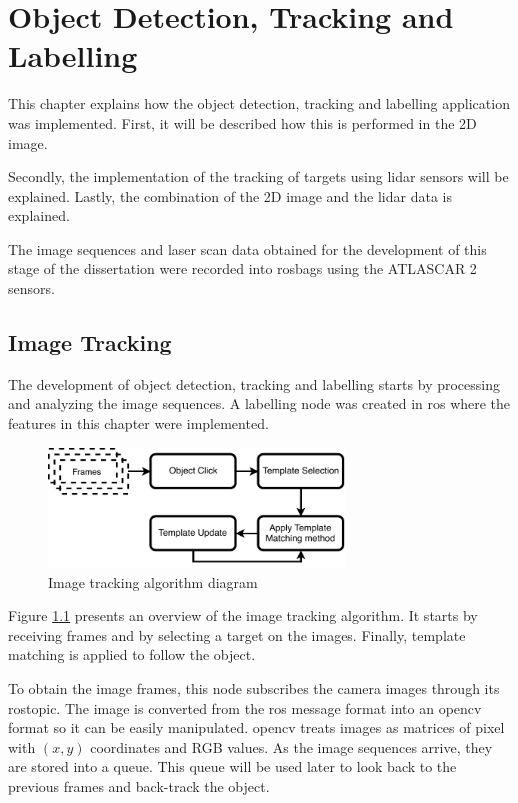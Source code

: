 \chapter{Object Detection, Tracking and Labelling}

This chapter explains how the object detection, tracking and labelling application was implemented. First, it will be described how this is performed in the 2D image. 

Secondly, the implementation of the tracking of targets using \gls{lidar} sensors will be explained. Lastly, the combination of the 2D image and the \gls{lidar} data is explained.

The image sequences and laser scan data obtained for the development of this stage of the dissertation were recorded into rosbags using the ATLASCAR 2 sensors.

\section{Image Tracking}

The development of object detection, tracking and labelling starts by processing and analyzing the image sequences. A labelling node was created in \gls{ros} where the features in this chapter were implemented. 

\begin{figure}[htp]
	
	\centering
	\includegraphics[width=0.7\textwidth]{caplabel/imgs/templatediagram.pdf}
	
	\caption{Image tracking algorithm diagram}
	\label{fig:imagediagram}
	
\end{figure}

Figure \ref{fig:imagediagram} presents an overview of the image tracking algorithm. It starts by receiving frames and by selecting a target on the images. Finally, template matching is applied to follow the object.

To obtain the image frames, this node subscribes the camera images through its rostopic. The image is converted from the \gls{ros} message format into an \gls{opencv} format so it can be easily manipulated. \gls{opencv} treats images as matrices of pixel with $(x,y)$ coordinates and RGB values. As the image sequences arrive, they are stored into a queue. This queue will be used later to look back to the previous frames and back-track the object. 

